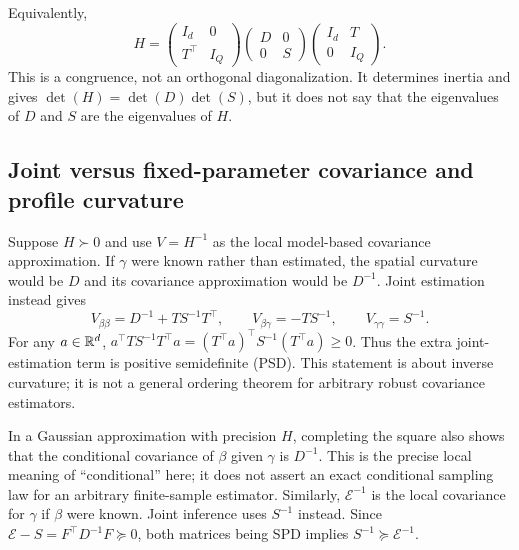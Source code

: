 Equivalently,
\begin{equation}
 H=
 \begin{pmatrix}I_d&0\\T^\top&I_Q\end{pmatrix}
 \begin{pmatrix}D&0\\0&S\end{pmatrix}
 \begin{pmatrix}I_d&T\\0&I_Q\end{pmatrix}.
 \label{cov-congruence}
\end{equation}
This is a congruence, not an orthogonal diagonalization.  It determines
inertia and gives $\det(H)=\det(D)\det(S)$, but it does not say that
the eigenvalues of $D$ and $S$ are the eigenvalues of $H$.

\subsection{Joint versus fixed-parameter covariance and profile curvature}
\label{cov-joint-conditional}

Suppose $H\succ0$ and use $V=H^{-1}$ as the local model-based
covariance approximation.  If $\gamma$ were known rather than estimated,
the spatial curvature would be $D$ and its covariance approximation
would be $D^{-1}$.  Joint estimation instead gives
\begin{equation}
 V_{\beta\beta}=D^{-1}+TS^{-1}T^\top,\qquad
 V_{\beta\gamma}=-TS^{-1},\qquad V_{\gamma\gamma}=S^{-1}.
 \label{cov-joint-blocks}
\end{equation}
For any $a\in\mathbb R^d$,
$a^\top TS^{-1}T^\top a=(T^\top a)^\top S^{-1}(T^\top a)\geq0$.
Thus the extra joint-estimation term is positive semidefinite (PSD).
This statement is about inverse curvature; it is not a general
ordering theorem for arbitrary robust covariance estimators.

In a Gaussian approximation with precision $H$, completing the square
also shows that the conditional covariance of $\beta$ given $\gamma$
is $D^{-1}$.  This is the precise local meaning of ``conditional'' here;
it does not assert an exact conditional sampling law for an arbitrary
finite-sample estimator.  Similarly, $\mathcal E^{-1}$ is the local
covariance for $\gamma$ if $\beta$ were known.  Joint inference uses
$S^{-1}$ instead.  Since
$\mathcal E-S=F^\top D^{-1}F\succeq0$, both matrices being SPD implies
$S^{-1}\succeq\mathcal E^{-1}$.

